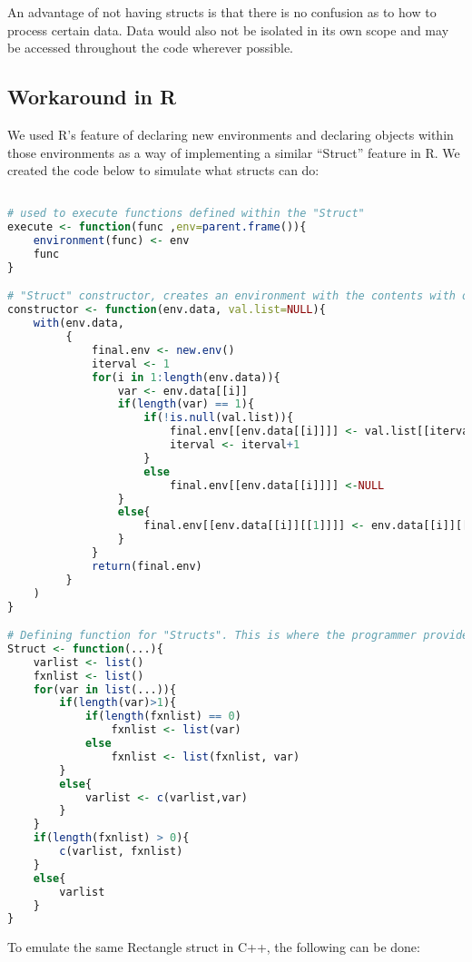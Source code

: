 \documentclass[12pt]{article}
\begin{document}
An advantage of not having structs is that there is no confusion as to how to process certain data. Data would also not be isolated in its own scope and may be accessed throughout the code wherever possible. 

\subsection{Workaround in R}

We used R's feature of declaring new environments and declaring objects within those environments as a way of implementing a similar ``Struct'' feature in R. We created the code below to simulate what structs can do:

\begin{lstlisting}[language=R]

# used to execute functions defined within the "Struct"
execute <- function(func ,env=parent.frame()){
    environment(func) <- env
    func
}

# "Struct" constructor, creates an environment with the contents with or without values
constructor <- function(env.data, val.list=NULL){
    with(env.data,
         {
             final.env <- new.env()
             iterval <- 1
             for(i in 1:length(env.data)){
                 var <- env.data[[i]]
                 if(length(var) == 1){
                     if(!is.null(val.list)){
                         final.env[[env.data[[i]]]] <- val.list[[iterval]]
                         iterval <- iterval+1
                     }
                     else
                         final.env[[env.data[[i]]]] <-NULL
                 }
                 else{
                     final.env[[env.data[[i]][[1]]]] <- env.data[[i]][[2]]
                 }
             }
             return(final.env)
         }
    )
}

# Defining function for "Structs". This is where the programmer provides variable names and functions to be used.
Struct <- function(...){
    varlist <- list()
    fxnlist <- list()
    for(var in list(...)){
        if(length(var)>1){
            if(length(fxnlist) == 0)
                fxnlist <- list(var)
            else
                fxnlist <- list(fxnlist, var)
        }
        else{
            varlist <- c(varlist,var)
        }
    }
    if(length(fxnlist) > 0){
        c(varlist, fxnlist)
    }
    else{
        varlist
    }
}
\end{lstlisting}

To emulate the same Rectangle struct in C++, the following can be done:
\end{document}
